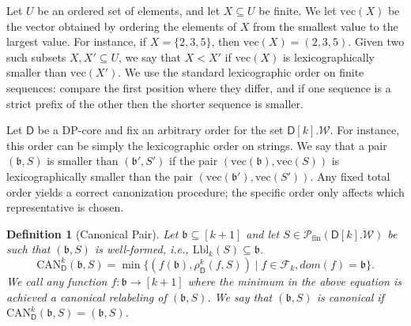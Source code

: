 \documentclass[11pt,a4paper]{article}
\newcommand{\vectorfromset}{\mathrm{vec}}
\newtheorem{definition}[theorem]{Definition}
\newcommand{\treewidthvalue}{k}
\newcommand{\abag}{\mathfrak{b}}
\newcommand{\allwitnesses}{\mathcal{W}}
\newcommand{\finitepowerset}[1]{\mathcal{P}_{\mathrm{fin}}(#1)}
\newcommand{\dpcore}{\mathsf{D}}
\newcommand{\witnessset}{S}
\newcommand{\domain}{dom}
\newcommand{\relabelingfunction}{f}
\newcommand{\relabelclass}{\mathcal{F}}
\newcommand{\action}{\rho}
\newcommand{\canonic}{\mathrm{CAN}}
\begin{document}
Let $U$ be an ordered set of elements, and let $X\subseteq U$ be finite. We let $\vectorfromset(X)$ be the vector obtained by
ordering the elements of $X$ from the smallest
value to the largest value. For instance, if $X = \{2,3,5\}$, then $\vectorfromset(X) = (2,3,5)$.
Given two such subsets $X,X'\subseteq U$, we say
that $X<X'$ if $\vectorfromset(X)$ is
lexicographically smaller than $\vectorfromset(X')$.
We use the standard lexicographic order on finite sequences: compare the first position where they differ, and if one sequence is a strict prefix of the other then the shorter sequence is smaller.

Let $\dpcore$ be a DP-core and fix an arbitrary
order for the set $\dpcore[\treewidthvalue].\allwitnesses$. For instance,
this order can be simply the lexicographic order on strings. We say that a pair $(\abag,\witnessset)$
is smaller than $(\abag',\witnessset')$ if the pair
$(\vectorfromset(\abag), \vectorfromset(\witnessset))$ is lexicographically smaller than the pair
$(\vectorfromset(\abag'), \vectorfromset(\witnessset'))$.
Any fixed total order yields a correct canonization procedure; the specific order only affects which representative is chosen.

\begin{definition}[Canonical Pair]\label{definition:canonicalpair}
Let $\abag\subseteq [\treewidthvalue+1]$ and let $\witnessset\in \finitepowerset{\dpcore[\treewidthvalue].\allwitnesses}$ be such that $(\abag,\witnessset)$ is well-formed, i.e., $\mathrm{Lbl}_{\treewidthvalue}(\witnessset)\subseteq \abag$.
$$\canonic_{\dpcore}^k(\abag,\witnessset) = \min \{(\relabelingfunction(\abag),\action_{\dpcore}^{\treewidthvalue}(\relabelingfunction,\witnessset))\;|\; \relabelingfunction\in \relabelclass_\treewidthvalue, \mathit{\domain(\relabelingfunction) = \abag}\}.$$
We call any function $f:\abag\rightarrow [\treewidthvalue+1]$ where the minimum in the above equation is achieved a
{\em canonical relabeling of $(\abag,\witnessset)$}.
We say that $(\abag,\witnessset)$ is \emph{canonical} if $\canonic_{\dpcore}^k(\abag,\witnessset)=(\abag,\witnessset)$.
\end{definition}
\end{document}
